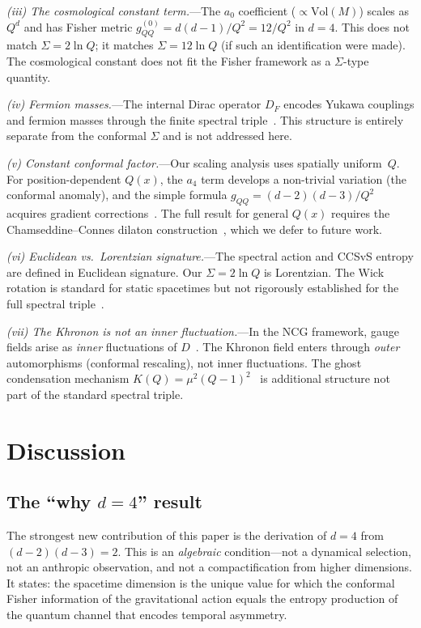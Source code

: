 \documentclass[prd,twocolumn,superscriptaddress,longbibliography]{revtex4-2}
\newcommand{\Vol}{\mathrm{Vol}}
\begin{document}
\emph{(iii) The cosmological constant term.}---The $a_0$
coefficient ($\propto\Vol(M)$) scales as $Q^d$ and has
Fisher metric $g_{QQ}^{(0)} = d(d-1)/Q^2 = 12/Q^2$ in
$d=4$.
This does not match $\Sigma = 2\ln Q$; it matches
$\Sigma = 12\ln Q$ (if such an identification were made).
The cosmological constant does not fit the Fisher framework
as a $\Sigma$-type quantity.

\emph{(iv) Fermion masses.}---The internal Dirac operator
$D_F$ encodes Yukawa couplings and fermion masses through the
finite spectral triple~\cite{CCM2007}.
This structure is entirely separate from the conformal
$\Sigma$ and is not addressed here.

\emph{(v) Constant conformal factor.}---Our scaling
analysis uses spatially uniform~$Q$.
For position-dependent $Q(x)$, the $a_4$ term develops
a non-trivial variation (the conformal anomaly), and the
simple formula $g_{QQ} = (d-2)(d-3)/Q^2$ acquires gradient
corrections~\cite{CC2006}.
The full result for general $Q(x)$ requires the
Chamseddine--Connes dilaton
construction~\cite{CC2006}, which we defer to future work.

\emph{(vi) Euclidean vs.\ Lorentzian signature.}---The
spectral action and CCSvS entropy are defined in Euclidean
signature.
Our $\Sigma = 2\ln Q$ is Lorentzian.
The Wick rotation is standard for static spacetimes but
not rigorously established for the full spectral
triple~\cite{vandenDungen2016,Besnard2018}.

\emph{(vii) The Khronon is not an inner fluctuation.}---In
the NCG framework, gauge fields arise as \emph{inner}
fluctuations of $D$~\cite{CC1997,vS2024}.
The Khronon field enters through \emph{outer}
automorphisms (conformal rescaling), not inner fluctuations.
The ghost condensation mechanism
$K(Q) = \mu^2(Q-1)^2$~\cite{BS2024} is additional
structure not part of the standard spectral triple.


\section{Discussion}
\label{sec:discussion}

\subsection{The ``why $d=4$'' result}

The strongest new contribution of this paper is the derivation
of $d=4$ from $(d-2)(d-3)=2$.
This is an \emph{algebraic} condition---not a dynamical
selection, not an anthropic observation, and not a
compactification from higher dimensions.
It states: the spacetime dimension is the unique value for
which the conformal Fisher information of the gravitational
action equals the entropy production of the quantum channel
that encodes temporal asymmetry.
\end{document}
